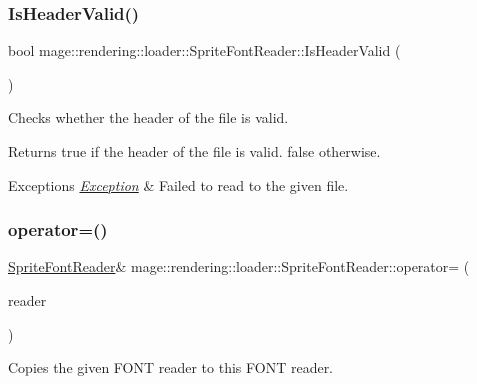 \subsubsection{\texorpdfstring{Is\+Header\+Valid()}{IsHeaderValid()}}
{\footnotesize\ttfamily bool mage\+::rendering\+::loader\+::\+Sprite\+Font\+Reader\+::\+Is\+Header\+Valid (\begin{DoxyParamCaption}{ }\end{DoxyParamCaption})\hspace{0.3cm}{\ttfamily [private]}}

Checks whether the header of the file is valid.

\begin{DoxyReturn}{Returns}
{\ttfamily true} if the header of the file is valid. {\ttfamily false} otherwise. 
\end{DoxyReturn}

\begin{DoxyExceptions}{Exceptions}
{\em \mbox{\hyperlink{classmage_1_1_exception}{Exception}}} & Failed to read to the given file. \\
\hline
\end{DoxyExceptions}
\mbox{\label{classmage_1_1rendering_1_1loader_1_1_sprite_font_reader_a645988b6bba2a4fda93d18c4c9e3d09c}} 
\subsubsection{\texorpdfstring{operator=()}{operator=()}\hspace{0.1cm}{\footnotesize\ttfamily [1/2]}}
{\footnotesize\ttfamily \mbox{\hyperlink{classmage_1_1rendering_1_1loader_1_1_sprite_font_reader}{Sprite\+Font\+Reader}}\& mage\+::rendering\+::loader\+::\+Sprite\+Font\+Reader\+::operator= (\begin{DoxyParamCaption}\item[{const \mbox{\hyperlink{classmage_1_1rendering_1_1loader_1_1_sprite_font_reader}{Sprite\+Font\+Reader}} \&}]{reader }\end{DoxyParamCaption})\hspace{0.3cm}{\ttfamily [delete]}}

Copies the given F\+O\+NT reader to this F\+O\+NT reader.


